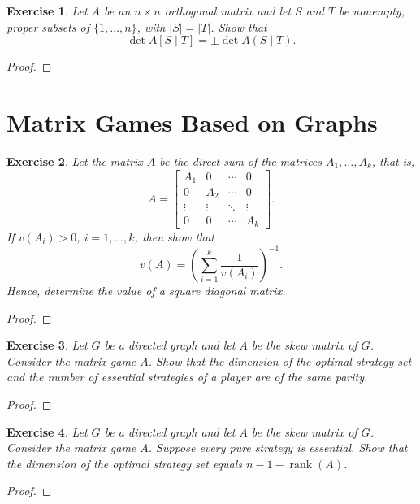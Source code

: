 \documentclass[11pt]{article}
\newtheorem{exercise}{Exercise}[section]
\theoremstyle{definition}
\begin{document}
\begin{exercise}
Let $A$ be an $n\times n$ orthogonal matrix and let $S$ and $T$ be nonempty, proper subsets of
$\{1,\ldots,n\}$, with $|S|=|T|$. Show that
\[
\det A[S\mid T]=\pm \det A(S\mid T).
\]
\end{exercise}
\begin{proof}
\end{proof}


\clearpage
\section{Matrix Games Based on Graphs}

\begin{exercise}
Let the matrix $A$ be the direct sum of the matrices $A_1,\ldots,A_k$, that is,
\[
A=
\begin{bmatrix}
A_1 & 0   & \cdots & 0\\
0   & A_2 & \cdots & 0\\
\vdots & \vdots & \ddots & \vdots\\
0 & 0 & \cdots & A_k
\end{bmatrix}.
\]
If $v(A_i)>0$, $i=1,\ldots,k$, then show that
\[
v(A)=\left(\sum_{i=1}^k \frac{1}{v(A_i)}\right)^{-1}.
\]
Hence, determine the value of a square diagonal matrix.
\end{exercise}
\begin{proof}
\end{proof}

\begin{exercise}
Let $G$ be a directed graph and let $A$ be the skew matrix of $G$. Consider the matrix game $A$.
Show that the dimension of the optimal strategy set and the number of essential strategies of
a player are of the same parity.
\end{exercise}
\begin{proof}
\end{proof}

\begin{exercise}
Let $G$ be a directed graph and let $A$ be the skew matrix of $G$. Consider the matrix game $A$.
Suppose every pure strategy is essential. Show that the dimension of the optimal strategy set
equals $n-1-\operatorname{rank}(A)$.
\end{exercise}
\begin{proof}
\end{proof}
\end{document}
